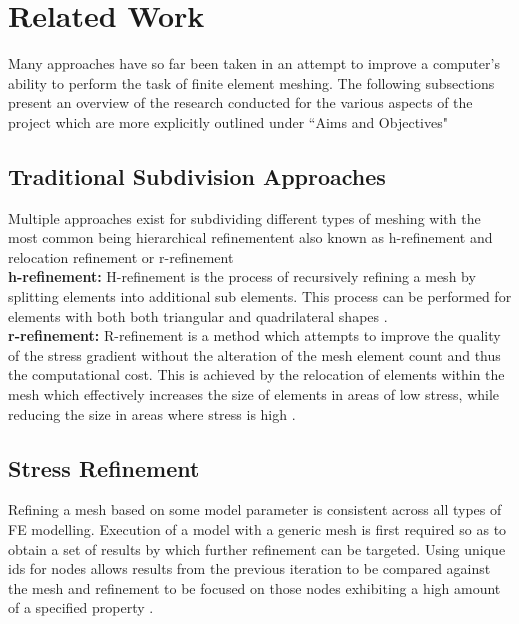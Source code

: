 \section{Related Work}
Many approaches have so far been taken in an attempt to improve a computer's ability to perform the task of finite element meshing. The following subsections present an overview of the research conducted for the various aspects of the project which are more explicitly outlined under ``Aims and Objectives"

\subsection{Traditional Subdivision Approaches}
Multiple approaches exist for subdividing different types of meshing with the most common being hierarchical refinementent also known as h-refinement and relocation refinement or r-refinement\cite{HandPRefinements} \cite{RRefinement}\\ 

\noindent
\textbf{h-refinement: }
H-refinement is the process of recursively refining a mesh by splitting elements into additional sub elements. This process can be performed for elements with both both triangular and quadrilateral shapes \cite{HandPRefinements}. \\ 

\noindent
\textbf{r-refinement: }
R-refinement is a method which attempts to improve the quality of the stress gradient without the alteration of the mesh element count and thus the computational cost. This is achieved by the relocation of elements within the mesh which effectively increases the size of elements in areas of low stress, while reducing the size in areas where stress is high \cite{RRefinement}.


\subsection{Stress Refinement}
Refining a mesh based on some model parameter is consistent across all types of FE modelling. Execution of a model with a generic mesh is first required so as to obtain a set of results by which further refinement can be targeted. Using unique ids for nodes allows results from the previous iteration to be compared against the mesh and refinement to be focused on those nodes exhibiting a high amount of a specified property \cite{FiniteElementMeshRefinement}.




